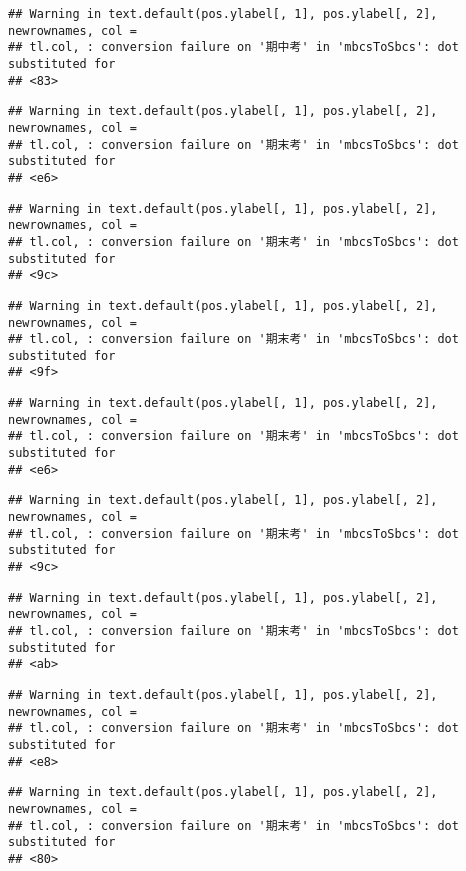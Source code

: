 \documentclass[
]{book}
\begin{document}
\begin{verbatim}
## Warning in text.default(pos.ylabel[, 1], pos.ylabel[, 2], newrownames, col =
## tl.col, : conversion failure on '期中考' in 'mbcsToSbcs': dot substituted for
## <83>
\end{verbatim}

\begin{verbatim}
## Warning in text.default(pos.ylabel[, 1], pos.ylabel[, 2], newrownames, col =
## tl.col, : conversion failure on '期末考' in 'mbcsToSbcs': dot substituted for
## <e6>
\end{verbatim}

\begin{verbatim}
## Warning in text.default(pos.ylabel[, 1], pos.ylabel[, 2], newrownames, col =
## tl.col, : conversion failure on '期末考' in 'mbcsToSbcs': dot substituted for
## <9c>
\end{verbatim}

\begin{verbatim}
## Warning in text.default(pos.ylabel[, 1], pos.ylabel[, 2], newrownames, col =
## tl.col, : conversion failure on '期末考' in 'mbcsToSbcs': dot substituted for
## <9f>
\end{verbatim}

\begin{verbatim}
## Warning in text.default(pos.ylabel[, 1], pos.ylabel[, 2], newrownames, col =
## tl.col, : conversion failure on '期末考' in 'mbcsToSbcs': dot substituted for
## <e6>
\end{verbatim}

\begin{verbatim}
## Warning in text.default(pos.ylabel[, 1], pos.ylabel[, 2], newrownames, col =
## tl.col, : conversion failure on '期末考' in 'mbcsToSbcs': dot substituted for
## <9c>
\end{verbatim}

\begin{verbatim}
## Warning in text.default(pos.ylabel[, 1], pos.ylabel[, 2], newrownames, col =
## tl.col, : conversion failure on '期末考' in 'mbcsToSbcs': dot substituted for
## <ab>
\end{verbatim}

\begin{verbatim}
## Warning in text.default(pos.ylabel[, 1], pos.ylabel[, 2], newrownames, col =
## tl.col, : conversion failure on '期末考' in 'mbcsToSbcs': dot substituted for
## <e8>
\end{verbatim}

\begin{verbatim}
## Warning in text.default(pos.ylabel[, 1], pos.ylabel[, 2], newrownames, col =
## tl.col, : conversion failure on '期末考' in 'mbcsToSbcs': dot substituted for
## <80>
\end{verbatim}
\end{document}
